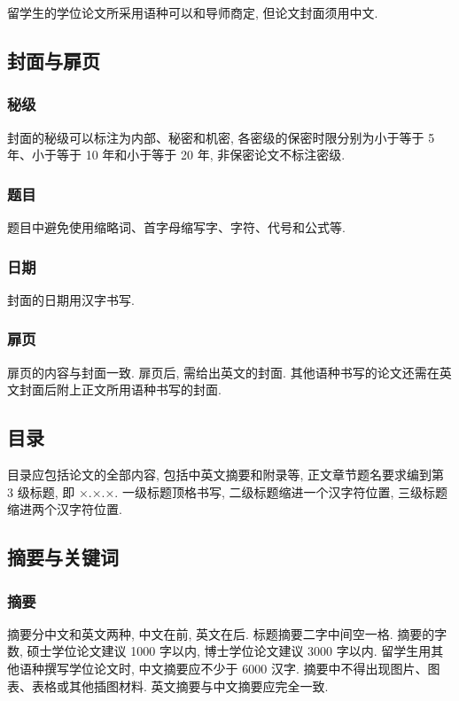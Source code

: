 留学生的学位论文所采用语种可以和导师商定, 但论文封面须用中文.

\subsection{封面与扉页}

\subsubsection{秘级}

封面的秘级可以标注为内部、秘密和机密, 各密级的保密时限分别为小于等于 5 年、小于等于 10 年和小于等于 20 年, 非保密论文不标注密级.

\subsubsection{题目}

题目中避免使用缩略词、首字母缩写字、字符、代号和公式等.

\subsubsection{日期}

封面的日期用汉字书写.

\subsubsection{扉页}

扉页的内容与封面一致. 扉页后, 需给出英文的封面. 其他语种书写的论文还需在英文封面后附上正文所用语种书写的封面.

\subsection{目录}

目录应包括论文的全部内容, 包括中英文摘要和附录等, 正文章节题名要求编到第 3 级标题, 即 ×.×.×. 一级标题顶格书写, 二级标题缩进一个汉字符位置, 三级标题缩进两个汉字符位置.

\subsection{摘要与关键词}

\subsubsection{摘要}

摘要分中文和英文两种, 中文在前, 英文在后. 标题摘要二字中间空一格. 摘要的字数, 硕士学位论文建议 1000 字以内, 博士学位论文建议 3000 字以内. 留学生用其他语种撰写学位论文时, 中文摘要应不少于 6000 汉字. 摘要中不得出现图片、图表、表格或其他插图材料. 英文摘要与中文摘要应完全一致.


